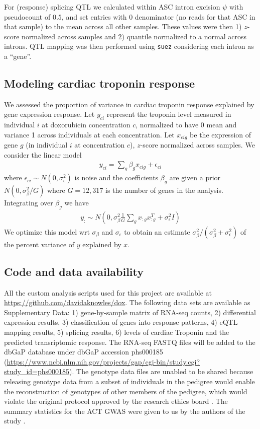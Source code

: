 \documentclass{article}
\begin{document}
For (response) splicing QTL we calculated within ASC intron excision $\psi$ with pseudocount of $0.5$, and set entries with $0$ denominator (no reads for that ASC in that sample) to the mean across all other samples. These values were then 1) $z$-score normalized across samples and 2) quantile normalized to a normal across introns. QTL mapping was then performed using \texttt{suez} considering each intron as a ``gene''. 

\subsection*{Modeling cardiac troponin response}

We assessed the proportion of variance in cardiac troponin response explained by gene expression response. Let $y_{ci}$ represent the troponin level measured in individual $i$ at doxorubicin concentration $c$, normalized to have 0 mean and variance 1 across individuals at each concentration. Let $x_{cig}$ be the expression of gene $g$ (in individual $i$ at concentration $c$), $z$-score normalized across samples. We consider the linear model 
\begin{align}
y_{ci} = \sum_g \beta_g x_{cig} + \epsilon_{ci}
\end{align}
where $\epsilon_{ci} \sim N(0,\sigma_\epsilon^2)$ is noise and the coefficients $\beta_g$ are given a prior $N(0, \sigma_\beta^2 / G )$ where $G=12,317$ is the number of genes in the analysis. Integrating over $\beta_g$ we have 
\begin{align}
y_{:} \sim N\left(0 , \sigma_\beta^2 \frac{1}{G} \sum_g x_{:g} x_{:g}^T + \sigma_\epsilon^2 I \right)
\end{align}
We optimize this model wrt $\sigma_\beta$ and $\sigma_\epsilon$ to obtain an estimate $\sigma_\beta^2 / (\sigma_\beta^2 + \sigma_\epsilon^2)$ of the percent variance of $y$ explained by $x$. 

\subsection*{Code and data availability}

All the custom analysis scripts used for this project are available at
\url{https://github.com/davidaknowles/dox}. The following data sets are
available as Supplementary Data: 1) gene-by-sample matrix of RNA-seq counts, 2)
differential expression results, 3) classification of genes into response
patterns, 4) eQTL mapping results, 5) splicing results, 6) levels of cardiac
Troponin and the predicted transriptomic response. The RNA-seq FASTQ files will
be added to the dbGaP database \cite{Tryka2014} under dbGaP accession phs000185
(\url{https://www.ncbi.nlm.nih.gov/projects/gap/cgi-bin/study.cgi?study_id=phs000185}).
The genotype data files are unabled to be shared because releasing genotype data
from a subset of individuals in the pedigree would enable the reconstruction of
genotypes of other members of the pedigree, which would violate the original
protocol approved by the research ethics board \cite{Livne2015}. The summary
statistics for the ACT GWAS were given to us by the authors of the study
\cite{Schneider2016}.
\end{document}
